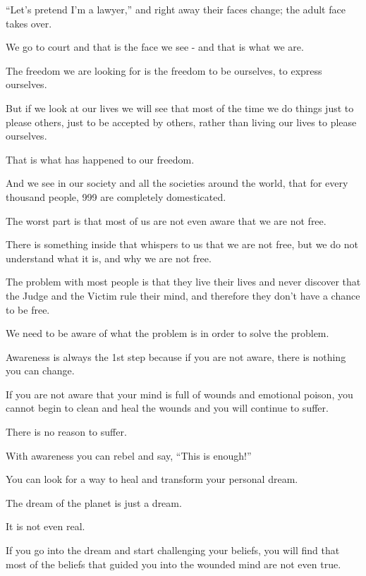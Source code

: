 \documentclass{article}
\numberwithin{equation}{section}
\begin{document}
``Let's pretend I'm a lawyer,'' and right away their faces change; the adult face takes over.

We go to court and that is the face we see - and that is what we are.


%
The freedom we are looking for is the freedom to be ourselves, to express ourselves.

But if we look at our lives we will see that most of the time we do things just to please others, just to be accepted by others, rather than living our lives to please ourselves.

That is what has happened to our freedom.

And we see in our society and all the societies around the world, that for every thousand people, 999 are completely domesticated.

%
The worst part is that most of us are not even aware that we are not free.

There is something inside that whispers to us that we are not free, but we do not understand what it is, and why we are not free.

%
The problem with most people is that they live their lives and never discover that the Judge and the Victim rule their mind, and therefore they don't have a chance to be free.



We need to be aware of what the problem is in order to solve the problem.

%
Awareness is always the 1st step because if you are not aware, there is nothing you can change.

If you are not aware that your mind is full of wounds and emotional poison, you cannot begin to clean and heal the wounds and you will continue to suffer.

%
There is no reason to suffer.

With awareness you can rebel and say, ``This is enough!''

You can look for a way to heal and transform your personal dream.

The dream of the planet is just a dream.

It is not even real.

If you go into the dream and start challenging your beliefs, you will find that most of the beliefs that guided you into the wounded mind are not even true.
\end{document}
